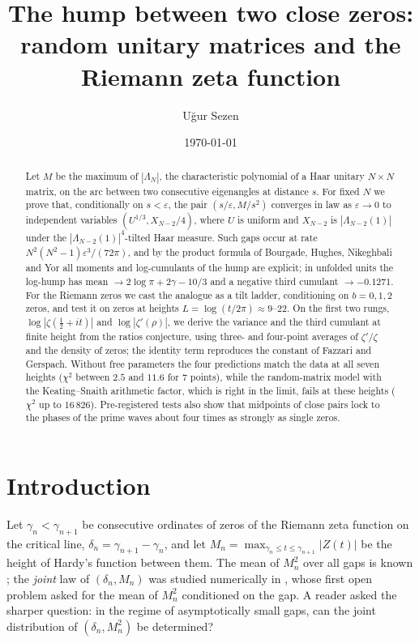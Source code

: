 \documentclass[12pt]{amsart}
\title[The hump between two close zeros]{The hump between two close
zeros:\\ random unitary matrices and the Riemann zeta function}
\author{U\u{g}ur Sezen}
\date{\today}
\theoremstyle{remark}
\newcommand{\eps}{\varepsilon}
\newcommand{\1}{\mathbf{1}}
\begin{document}
\begin{abstract}
Let $M$ be the maximum of $|\Lambda_N|$, the characteristic polynomial of
a Haar unitary $N\times N$ matrix, on the arc between two consecutive
eigenangles at distance $s$. For fixed $N$ we prove that, conditionally on
$s<\eps$, the pair $(s/\eps, M/s^2)$ converges in law as $\eps\to0$ to
independent variables $(U^{1/3}, X_{N-2}/4)$, where $U$ is uniform and
$X_{N-2}$ is $|\Lambda_{N-2}(1)|$ under the $|\Lambda_{N-2}(1)|^4$-tilted
Haar measure. Such gaps occur at rate $N^2(N^2-1)\eps^3/(72\pi)$, and by
the product formula of Bourgade, Hughes, Nikeghbali and Yor all moments and
log-cumulants of the hump are explicit; in unfolded units the log-hump has
mean $\to2\log\pi+2\gamma-10/3$ and a negative third cumulant
$\to-0.1271$. For the Riemann zeros we cast the analogue as a tilt ladder,
conditioning on $b=0,1,2$ zeros, and test it on zeros at heights
$L=\log(t/2\pi)\approx9$--$22$. On the first two rungs,
$\log|\zeta(\frac12+it)|$ and $\log|\zeta'(\rho)|$, we derive the variance
and the third cumulant at finite height from the ratios conjecture, using
three- and four-point averages of $\zeta'/\zeta$ and the density of zeros;
the identity term reproduces the constant of Fazzari and Gerspach. Without
free parameters the four predictions match the data at all seven heights
($\chi^2$ between $2.5$ and $11.6$ for $7$ points), while the random-matrix
model with the Keating--Snaith arithmetic factor, which is right in the
limit, fails at these heights ($\chi^2$ up to $16\,826$). Pre-registered
tests also show that midpoints of close pairs lock to the phases of the
prime waves about four times as strongly as single zeros.
\end{abstract}

\maketitle

\section{Introduction}

Let $\gamma_n<\gamma_{n+1}$ be consecutive ordinates of zeros of the
Riemann zeta function on the critical line, $\delta_n=\gamma_{n+1}-\gamma_n$,
and let $M_n=\max_{\gamma_n\le t\le\gamma_{n+1}}|Z(t)|$ be the height of
Hardy's function between them. The mean of $M_n^2$ over all gaps is known
\cite{CG85,HLPC24}; the \emph{joint} law of $(\delta_n,M_n)$ was studied
numerically in \cite{companion1}, whose first open problem asked for the
mean of $M_n^2$ conditioned on the gap. A reader asked the sharper
question: in the regime of asymptotically small gaps, can the joint
distribution of $(\delta_n,M_n^2)$ be determined?
\end{document}
